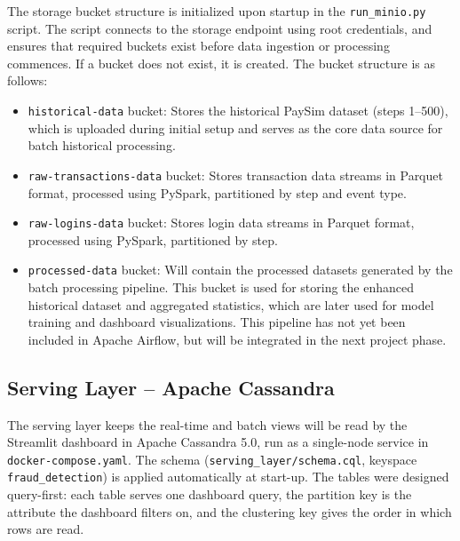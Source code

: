 \documentclass[titlepage]{article}
\begin{document}
The storage bucket structure is initialized upon startup in the \texttt{run\_minio.py} script. The script connects to the storage endpoint using root credentials, and ensures that required buckets exist before data ingestion or processing commences. If a bucket does not exist, it is created. The bucket structure is as follows:
\begin{itemize}
    \item \texttt{historical-data} bucket: Stores the historical PaySim dataset (steps 1--500), which is uploaded during initial setup and serves as the core data source for batch historical processing.
    \item \texttt{raw-transactions-data} bucket: Stores transaction data streams in Parquet format, processed using PySpark, partitioned by step and event type.
    \item \texttt{raw-logins-data} bucket: Stores login data streams in Parquet format, processed using PySpark, partitioned by step.
    \item \texttt{processed-data} bucket: Will contain the processed datasets generated by the batch processing pipeline. This bucket is used for storing the enhanced historical dataset and aggregated statistics, which are later used for model training and dashboard visualizations. This pipeline has not yet been included in Apache Airflow, but will be integrated in the next project phase.
\end{itemize}

\subsection{Serving Layer -- Apache Cassandra}\label{sec:cassandra}

The serving layer keeps the real-time and batch views will be read by the Streamlit dashboard in Apache Cassandra 5.0, run as a single-node service in \texttt{docker-compose.yaml}. 
The schema (\texttt{serving\_layer/schema.cql}, keyspace \texttt{fraud\_detection}) is applied automatically at start-up.
The tables were designed query-first: each table serves one dashboard query, the partition key is the attribute the dashboard filters on, and the clustering key gives the order in which rows are read.
\end{document}
